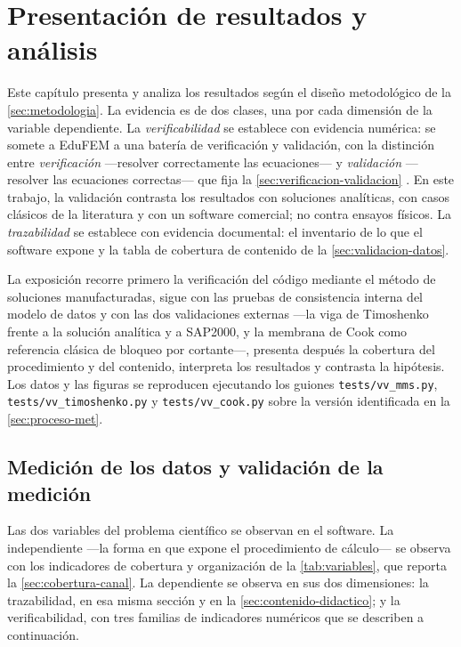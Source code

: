 \chapter{Presentación de resultados y análisis}
\label{cap:resultados}


Este capítulo presenta y analiza los resultados según el diseño metodológico de la \autoref{sec:metodologia}. La evidencia es de dos clases, una por cada dimensión de la variable dependiente. La \emph{verificabilidad} se establece con evidencia numérica: se somete a EduFEM a una batería de verificación y validación, con la distinción entre \emph{verificación} —resolver correctamente las ecuaciones— y \emph{validación} —resolver las ecuaciones correctas— que fija la \autoref{sec:verificacion-validacion} \autocite[pp.~13-14]{oberkampf2010vv}. En este trabajo, la validación contrasta los resultados con soluciones analíticas, con casos clásicos de la literatura y con un software comercial; no contra ensayos físicos. La \emph{trazabilidad} se establece con evidencia documental: el inventario de lo que el software expone y la tabla de cobertura de contenido de la \autoref{sec:validacion-datos}.

La exposición recorre primero la verificación del código mediante el método de soluciones manufacturadas, sigue con las pruebas de consistencia interna del modelo de datos y con las dos validaciones externas —la viga de Timoshenko frente a la solución analítica y a SAP2000, y la membrana de Cook como referencia clásica de bloqueo por cortante—, presenta después la cobertura del procedimiento y del contenido, interpreta los resultados y contrasta la hipótesis. Los datos y las figuras se reproducen ejecutando los guiones \texttt{tests/vv\_mms.py}, \texttt{tests/vv\_timoshenko.py} y \texttt{tests/vv\_cook.py} sobre la versión identificada en la \autoref{sec:proceso-met}.

\section{Medición de los datos y validación de la medición}
\label{sec:medicion}

Las dos variables del problema científico se observan en el software. La independiente —la forma en que expone el procedimiento de cálculo— se observa con los indicadores de cobertura y organización de la \autoref{tab:variables}, que reporta la \autoref{sec:cobertura-canal}. La dependiente se observa en sus dos dimensiones: la trazabilidad, en esa misma sección y en la \autoref{sec:contenido-didactico}; y la verificabilidad, con tres familias de indicadores numéricos que se describen a continuación.

